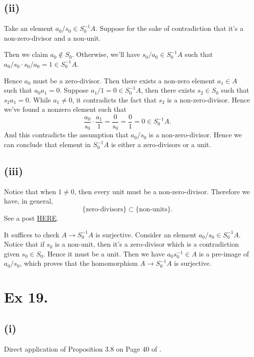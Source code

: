 \subsection{(ii)}

Take an element $a_0/s_0\in S_0^{-1}A$. Suppose for the sake of contradiction that it's a non-zero-divisor and a non-unit. 

Then we claim $a_0\notin S_0$. Otherwise, we'll have $s_0/a_0\in S_0^{-1}A$ such that $a_0/s_0\cdot s_0/a_0=1\in S_0^{-1}A$. 

Hence $a_0$ must be a zero-divisor. Then there exists a non-zero element $a_1\in A$ such that $a_0a_1=0$. Suppose $a_1/1=0\in S_0^{-1}A$, then there exists $s_2\in S_0$ such that $s_2a_1=0$. While $a_1\neq 0$, it contradicts the fact that $s_2$ is a non-zero-divisor. Hence we've found a nonzero element such that 
\[\frac{a_0}{s_0}\cdot \frac{a_1}{1}=\frac{0}{s_0}=\frac{0}{1}=0\in S_0^{-1}A.\]
And this contradicts the assumption that $a_0/s_0$ is a non-zero-divisor. Hence we can conclude that element in $S_0^{-1}A$ is either a zero-divisors or a unit.

\subsection{(iii)} %

Notice that when $1\neq 0$, then every unit must be a non-zero-divisor. Therefore we have, in general, \[\{\text{zero-divisors}\}\subset\{\text{non-units}\}.\]
See a post \href{https://math.stackexchange.com/questions/2062615/can-an-element-in-a-ring-with-unity-be-both-a-unit-and-zero-divisor}{HERE}.

It suffices to check $A\to S_0^{-1}A$ is surjective. Consider an element $a_0/s_0\in S_0^{-1}A$. Notice that if $s_0$ is a non-unit, then it's a zero-divisor which is a contradiction given $s_0\in S_0$. Hence it must be a unit. Then we have $a_0s_0^{-1}\in A$ is a pre-image of $a_0/s_0$, which proves that the homomorphism $A\to S_0^{-1}A$ is surjective. 

\section{Ex 19.}

\subsection{(i)} 
Direct application of Proposition 3.8 on Page 40 of \cite{atiyah1994introduction}. 